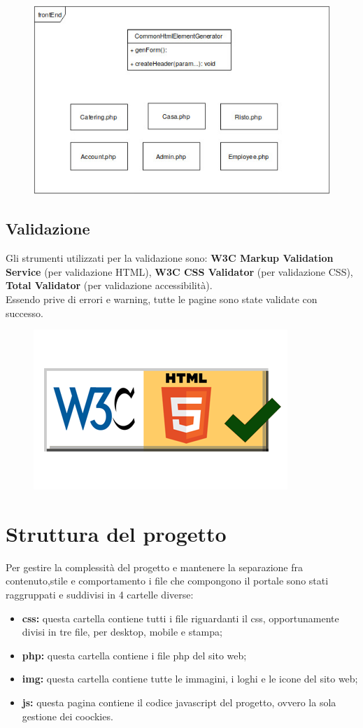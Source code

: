 \begin{figure}[h!]
	\includegraphics[width=1\linewidth]{StyleLatex/PHP_frontend.jpg}
\end{figure}

\subsection{Validazione}

Gli strumenti utilizzati per la validazione sono: \textbf{W3C Markup Validation Service} (per validazione HTML), \textbf{W3C CSS Validator} (per validazione CSS), \textbf{Total Validator} (per validazione accessibilità).\\
Essendo prive di errori e warning, tutte le pagine sono state validate con successo.

\begin{figure}[h!]
	\includegraphics[width=0.2\linewidth]{StyleLatex/badge-html5.png}
\end{figure}

\section{Struttura del progetto}

Per gestire la complessità del progetto e mantenere la separazione fra contenuto,stile e comportamento i file che compongono il portale sono stati raggruppati e suddivisi in 4 cartelle diverse:

\begin{itemize}
	\item \textbf{css:} questa cartella contiene tutti i file riguardanti il css, opportunamente divisi in tre file, per desktop, mobile e stampa;
	\item \textbf{php:} questa cartella contiene i file php del sito web;
	\item \textbf{img:} questa cartella contiene tutte le immagini, i loghi e le icone del sito web;
	\item \textbf{js:}  questa pagina contiene il codice javascript del progetto, ovvero la sola gestione dei coockies.
\end{itemize}

